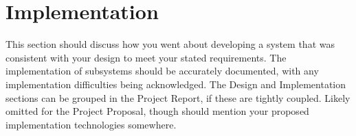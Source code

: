 
\chapter{Implementation}

This section should discuss how you went about developing a system that was
consistent with your design to meet your stated requirements. The implementation of subsystems should
be accurately documented, with any implementation difficulties being acknowledged. The Design and
Implementation sections can be grouped in the Project Report, if these are tightly coupled. Likely omitted
for the Project Proposal, though should mention your proposed implementation technologies somewhere.

